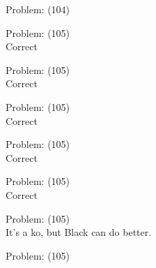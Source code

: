 \documentclass[11pt]{article}
\begin{document}
\begin{minipage}[t]{0.5\textwidth}
  {\centering
  
  Problem: (104)\\
  
  }
\end{minipage}
\begin{minipage}[t]{0.5\textwidth}
  {\centering
  
  Problem: (105)\\
  Correct\\
  }
\end{minipage}
\begin{minipage}[t]{0.5\textwidth}
  {\centering
  
  Problem: (105)\\
  Correct\\
  }
\end{minipage}
\begin{minipage}[t]{0.5\textwidth}
  {\centering
  
  Problem: (105)\\
  Correct\\
  }
\end{minipage}
\begin{minipage}[t]{0.5\textwidth}
  {\centering
  
  Problem: (105)\\
  Correct\\
  }
\end{minipage}
\begin{minipage}[t]{0.5\textwidth}
  {\centering
  
  Problem: (105)\\
  Correct\\
  }
\end{minipage}
\begin{minipage}[t]{0.5\textwidth}
  {\centering
  
  Problem: (105)\\
  It's a ko, but Black can do better.\\
  }
\end{minipage}
\begin{minipage}[t]{0.5\textwidth}
  {\centering
  
  Problem: (105)\\
  
  }
\end{minipage}
\end{document}

